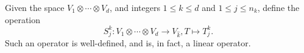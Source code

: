 \documentclass[../Lael_John_MasterThesis_Draft.tex]{subfiles}
\begin{document}
\begin{definition}\label{defn:slicingoperator}
    Given the space $V_1 \otimes \cdots \otimes V_d$, and integers $1 \leq k \leq d$ and $1 \leq j \leq n_k$, define the operation $$S_j^k:V_1\otimes \cdots \otimes V_d \to V_{\hat{k}}, T\mapsto T_j^k.$$Such an operator is well-defined, and is, in fact, a linear operator. 
\end{definition}
\end{document}
